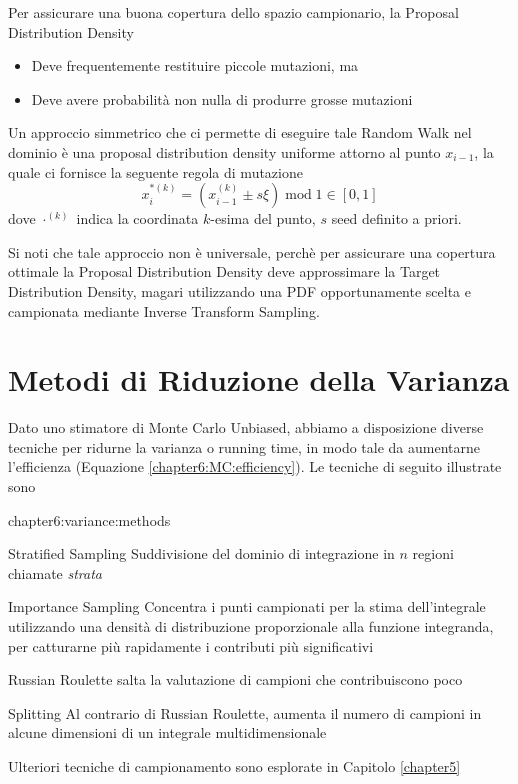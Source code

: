 Per assicurare una buona copertura dello spazio campionario, la Proposal Distribution Density
\begin{itemize}[topsep=0pt,noitemsep]
	\item Deve frequentemente restituire piccole mutazioni, ma
	\item Deve avere probabilit\`a non nulla di produrre grosse mutazioni\footnotemark{}
\end{itemize}
Un approccio simmetrico che ci permette di eseguire tale Random Walk nel dominio \`e una proposal distribution density uniforme attorno al punto 
$x_{i-1}$, la quale ci fornisce la seguente regola di mutazione
\begin{equation}
	x_i^{*(k)}=\left(x_{i-1}^{(k)}\pm s\xi\right)\operatorname{mod}1\in[0,1]
\end{equation}
dove $\cdot^{(k)}$ indica la coordinata $k$-esima del punto, $s$ seed definito a priori.\par
Si noti che tale approccio non \`e universale, perch\`e per assicurare una copertura ottimale la Proposal Distribution Density deve approssimare 
la Target Distribution Density, magari utilizzando una PDF opportunamente scelta e campionata mediante Inverse Transform Sampling.
\section{Metodi di Riduzione della Varianza}
Dato uno stimatore di Monte Carlo Unbiased, abbiamo a disposizione diverse tecniche per ridurne la varianza o running time, in modo tale da aumentarne 
l'efficienza (Equazione \ref{chapter6:MC:efficiency}). Le tecniche di seguito illustrate sono
\begin{altDescription}{chapter6:variance:methods}
	\item[Stratified Sampling] Suddivisione del dominio di integrazione in $n$ regioni chiamate \textit{strata}
	\item[Importance Sampling] Concentra i punti campionati per la stima dell'integrale utilizzando una densit\`a di distribuzione proporzionale alla 
		funzione integranda, per catturarne pi\`u rapidamente i contributi pi\`u significativi
	\item[Russian Roulette] salta la valutazione di campioni che contribuiscono poco
	\item[Splitting] Al contrario di Russian Roulette, aumenta il numero di campioni in alcune dimensioni di un integrale multidimensionale
\end{altDescription}
Ulteriori tecniche di campionamento sono esplorate in Capitolo \ref{chapter5}
